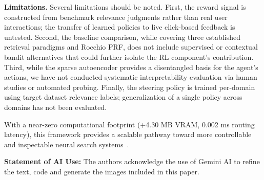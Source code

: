\documentclass[sigconf]{acmart}
\begin{document}
\textbf{Limitations.} Several limitations should be noted. First, the reward signal is constructed from benchmark relevance judgments rather than real user interactions; the transfer of learned policies to live click-based feedback is untested. Second, the baseline comparison, while covering three established retrieval paradigms and Rocchio PRF, does not include supervised or contextual bandit alternatives that could further isolate the RL component's contribution. Third, while the sparse autoencoder provides a disentangled basis for the agent's actions, we have not conducted systematic interpretability evaluation via human studies or automated probing. Finally, the steering policy is trained per-domain using target dataset relevance labels; generalization of a single policy across domains has not been evaluated.

With a near-zero computational footprint (+4.30 MB VRAM, 0.002 ms routing latency), this framework provides a scalable pathway toward more controllable and inspectable neural search systems~\cite{ouyang2022}.

\begin{acks}
\textbf{Statement of AI Use:} The authors acknowledge the use of Gemini AI to refine the text, code and generate the images included in this paper.
\end{acks}


\end{document}
